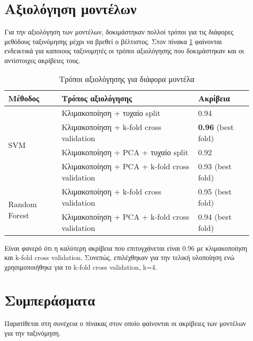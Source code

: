 \section{Αξιολόγηση μοντέλων}

Για την αξιολόγηση των μοντέλων, δοκιμάστηκαν πολλοί τρόποι για τις διάφορες μεθόδους ταξινόμησης μέχρι να βρεθεί ο βέλτιστος. Στον πίνακα \ref{table:tab1} φαίνονται ενδεικτικά για καποιους ταξινομητές οι τρόποι αξιολόγησης που δοκιμάστηκαν και οι αντίστοιχες ακρίβειες τους.


\begin{table}[H]
\begin{tabular}{|l|l|l|}
\hline
\textbf{Μέθοδος}               & \textbf{Τρόπος αξιολόγησης}                   & \textbf{Ακρίβεια}          \\ \hline
\multirow{4}{*}{SVM}           & Κλιμακοποίηση + τυχαίο split                  & 0.94                       \\ \cline{2-3} 
                               & Κλιμακοποίηση + k-fold cross validation       & \textbf{0.96} (best fold)  \\ \cline{2-3} 
                               & Κλιμακοποίηση + PCA + τυχαίο split            & 0.92                       \\ \cline{2-3} 
                               & Κλιμακοποίηση + PCA + k-fold cross validation & 0.93 (best fold)           \\ \hline
\multirow{2}{*}{Random Forest} & Κλιμακοποίηση + k-fold cross validation       & 0.95 (best fold)   	    \\ \cline{2-3} 
                               & Κλιμακοποίηση + PCA + k-fold cross validation & 0.94 (best fold)           \\ \hline
\end{tabular}
\caption{Τρόποι αξιολόγησης για διάφορα μοντέλα}
\label{table:tab1}
\end{table}

Είναι φανερό ότι η καλύτερη ακρίβεια που επιτυγχάνεται είναι 0.96 με κλιμακοποίηση και k-fold cross validation. Συνεπώς, επιλέχθηκαν για την τελική υλοποίηση ενώ χρησιμοποιήθηκε για το k-fold cross validation, k=4.

\section{Συμπεράσματα}

Παρατίθεται στη συνέχεια ο πίνακας στον οποίο φαίνονται οι ακρίβειες των μοντέλων για την ταξινόμηση.

